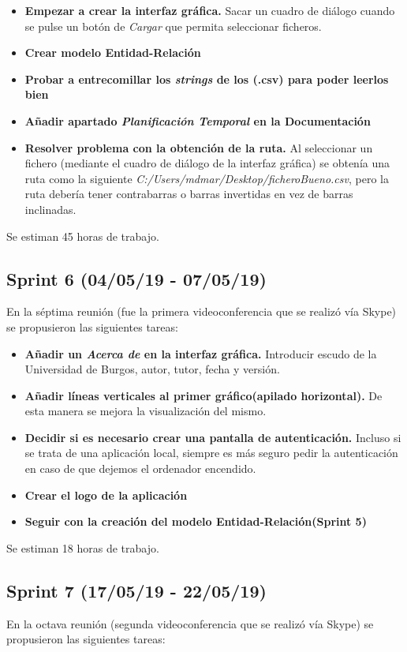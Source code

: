 \begin{itemize}
\item
\textbf{Empezar a crear la interfaz gráfica.} Sacar un cuadro de diálogo cuando se pulse un botón de \emph{Cargar} que permita seleccionar ficheros.
\item
\textbf{Crear modelo Entidad-Relación}
\item
\textbf{Probar a entrecomillar los \emph{strings} de los (.csv) para poder leerlos bien}
\item
\textbf{Añadir apartado \emph{Planificación Temporal} en la Documentación}
\item
\textbf{Resolver problema con la obtención de la ruta.} Al seleccionar un fichero (mediante el cuadro de diálogo de la interfaz gráfica) se obtenía una ruta como la siguiente \emph{C:/Users/mdmar/Desktop/ficheroBueno.csv}, pero la ruta debería tener contrabarras o barras invertidas en vez de barras inclinadas.
\end{itemize}

Se estiman 45 horas de trabajo.

\subsection{Sprint 6 (04/05/19 - 07/05/19)}
En la séptima reunión (fue la primera videoconferencia que se realizó vía Skype) se propusieron las siguientes tareas:

\begin{itemize}
\item
\textbf{Añadir un \emph{Acerca de} en la interfaz gráfica.} Introducir escudo de la Universidad de Burgos, autor, tutor, fecha y versión.
\item
\textbf{Añadir líneas verticales al primer gráfico(apilado horizontal).} De esta manera se mejora la visualización del mismo.
\item
\textbf{Decidir si es necesario crear una pantalla de autenticación.} Incluso si se trata de una aplicación local, siempre es más seguro pedir la autenticación en caso de que dejemos el ordenador encendido.
\item
\textbf{Crear el logo de la aplicación} 
\item
\textbf{Seguir con la creación del modelo Entidad-Relación(Sprint 5)}
\end{itemize}

Se estiman 18 horas de trabajo.

\subsection{Sprint 7 (17/05/19 - 22/05/19)}
En la octava reunión (segunda videoconferencia que se realizó vía Skype) se propusieron las siguientes tareas:

